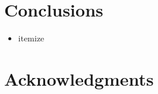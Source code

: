 





\section{Conclusions}\label{sec:conclusions}


\begin{itemize}
\item itemize
\end{itemize}

\cite{Tantithamthavorn}

\section*{Acknowledgments}





